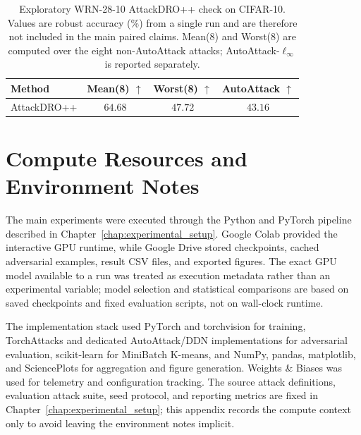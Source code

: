 \begin{table}[H]
\centering
\caption[Exploratory WRN-28-10 AttackDRO++ check]{Exploratory WRN-28-10
AttackDRO++ check on CIFAR-10. Values are robust accuracy (\%) from a single
run and are therefore not included in the main paired claims. Mean(8) and
Worst(8) are computed over the eight non-AutoAttack attacks;
AutoAttack-$\ell_\infty$ is reported separately.}
\label{tab:app_wrn2810_architecture_check}
\small
\setlength{\tabcolsep}{4pt}
\renewcommand{\arraystretch}{1.08}
\begin{tabular}{lccc}
\toprule
Method & Mean(8) $\uparrow$ & Worst(8) $\uparrow$ & AutoAttack $\uparrow$ \\
\midrule
AttackDRO++
& $64.68$
& $47.72$
& $43.16$ \\
\bottomrule
\end{tabular}
\end{table}


\chapter{Compute Resources and Environment Notes}
\label{app:compute}

The main experiments were executed through the Python and PyTorch pipeline
described in Chapter~\ref{chap:experimental_setup}.  Google Colab provided the
interactive GPU runtime, while Google Drive stored checkpoints, cached
adversarial examples, result CSV files, and exported figures.  The exact GPU
model available to a run was treated as execution metadata rather than an
experimental variable; model selection and statistical comparisons are based on
saved checkpoints and fixed evaluation scripts, not on wall-clock runtime.

The implementation stack used PyTorch and torchvision for training, TorchAttacks
and dedicated AutoAttack/DDN implementations for adversarial evaluation,
scikit-learn for MiniBatch K-means, and NumPy, pandas, matplotlib, and
SciencePlots for aggregation and figure generation.  Weights \& Biases was used
for telemetry and configuration tracking.  The source attack definitions,
evaluation attack suite, seed protocol, and reporting metrics are fixed in
Chapter~\ref{chap:experimental_setup}; this appendix records the compute context
only to avoid leaving the environment notes implicit.
